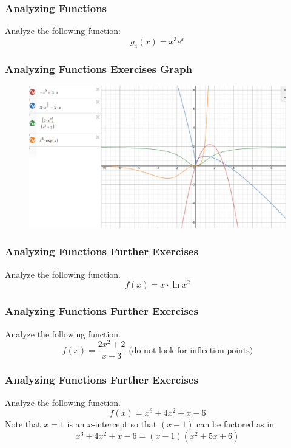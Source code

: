 \documentclass[xcolor=dvipsnames]{beamer}
\begin{document}
\begin{frame}
  \frametitle{Analyzing Functions}
{\ubung} Analyze the following function:
\begin{equation}
  \label{eq:xohsaemu}
g_{4}(x)=x^{3}e^{x}
\end{equation}
\end{frame}

\begin{frame}
  \frametitle{Analyzing Functions Exercises Graph}
  \begin{figure}[h]
    \includegraphics[scale=.4]{./diagrams/ft-11-AnalyzingFunctions.eps}
  \end{figure}
\end{frame}

\begin{frame}
  \frametitle{Analyzing Functions Further Exercises}
{\ubung} Analyze the following function.
\begin{equation}
  \label{eq:uufiexah}
f(x)=x\cdot\ln{}x^{2}
\end{equation}
\end{frame}

\begin{frame}
  \frametitle{Analyzing Functions Further Exercises}
{\ubung} Analyze the following function.
\begin{equation}
  \label{eq:opeemuix}
f(x)=\frac{2x^{2}+2}{x-3}\mbox{ (do not look for inflection points)}
\end{equation}
\end{frame}

\begin{frame}
  \frametitle{Analyzing Functions Further Exercises}
{\ubung} Analyze the following function.
\begin{equation}
  \label{eq:oisheith}
f(x)=x^{3}+4x^{2}+x-6
\end{equation}
Note that $x=1$ is an $x$-intercept so that $(x-1)$ can be factored as
in
\begin{equation}
  \label{eq:xohhafoe}
x^{3}+4x^{2}+x-6=(x-1)(x^{2}+5x+6)
\end{equation}
\end{frame}
\end{document}
